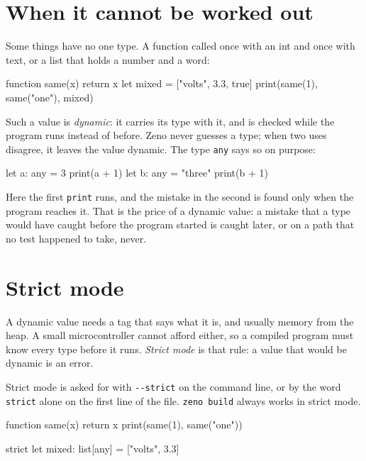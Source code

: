 \section{When it cannot be worked out}

Some things have no one type. A function called once with an int and
once with text, or a list that holds a number and a word:

\begin{zeno}
function same(x) {
    return x
}
let mixed = ["volts", 3.3, true]
print(same(1), same("one"), mixed)
\end{zeno}

Such a value is \emph{dynamic}: it carries its type with it, and is
checked while the program runs instead of before. Zeno never guesses a
type; when two uses disagree, it leaves the value dynamic. The type
\verb|any| says so on purpose:

\begin{zeno}[fails=yes]
let a: any = 3
print(a + 1)
let b: any = "three"
print(b + 1)
\end{zeno}

Here the first \verb|print| runs, and the mistake in the second is
found only when the program reaches it. That is the price of a dynamic
value: a mistake that a type would have caught before the program
started is caught later, or on a path that no test happened to take,
never.

\section{Strict mode}

A dynamic value needs a tag that says what it is, and usually memory
from the heap. A small microcontroller cannot afford either, so a
compiled program must know every type before it runs. \emph{Strict
mode} is that rule: a value that would be dynamic is an error.

Strict mode is asked for with \verb|--strict| on the command line, or
by the word \verb|strict| alone on the first line of the file.
\verb|zeno build| always works in strict mode.

\begin{zeno}[fails=yes, cmd=zeno check --strict {file}]
function same(x) {
    return x
}
print(same(1), same("one"))
\end{zeno}

\begin{zeno}[fails=yes]
strict
let mixed: list[any] = ["volts", 3.3]
\end{zeno}

